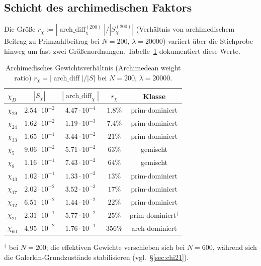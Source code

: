 \documentclass[a4paper,10pt,twocolumn]{article}
\theoremstyle{definition}
\theoremstyle{remark}
\newcommand{\chifn}{\chi}
\newcommand{\archdiff}{\operatorname{arch\_diff}}
\begin{document}
\subsection{Schicht des archimedischen Faktors}
\label{sec:archlayer}

Die Größe
$r_{\chifn}:=|\archdiff_{\chifn}^{(200)}|/|S_{\chifn}^{(200)}|$
(Verhältnis von archimedischem Beitrag zu Primzahlbeitrag bei $N=200$,
$\lambda=20000$) variiert über die Stichprobe hinweg um fast zwei Größenordnungen.
Tabelle~\ref{tab:archratio} dokumentiert diese Werte.

\begin{table}[t]
\caption{Archimedisches Gewichtsverhältnis (Archimedean weight ratio)
  $r_{\chifn}=|\archdiff|/|S|$ bei $N=200$, $\lambda=20000$.}
\label{tab:archratio}
\centering\scriptsize
\begin{tabular}{@{}lcccc@{}}
\toprule
$\chifn_D$ & $|S_{\chifn}|$ & $|\archdiff_{\chifn}|$ & $r_{\chifn}$ & Klasse \\
\midrule
$\chifn_{29}$ & $2.54\!\cdot\!10^{-2}$ & $4.47\!\cdot\!10^{-4}$ & $1.8\%$ & prim-dominiert \\
$\chifn_{24}$ & $1.62\!\cdot\!10^{-2}$ & $1.19\!\cdot\!10^{-3}$ & $7.4\%$ & prim-dominiert \\
$\chifn_{33}$ & $1.65\!\cdot\!10^{-1}$ & $3.44\!\cdot\!10^{-2}$ & $21\%$ & prim-dominiert \\
$\chifn_5$ & $9.06\!\cdot\!10^{-2}$ & $5.71\!\cdot\!10^{-2}$ & $63\%$ & gemischt \\
$\chifn_8$ & $1.16\!\cdot\!10^{-1}$ & $7.43\!\cdot\!10^{-2}$ & $64\%$ & gemischt \\
$\chifn_{13}$ & $1.02\!\cdot\!10^{-1}$ & $1.33\!\cdot\!10^{-2}$ & $13\%$ & prim-dominiert \\
$\chifn_{17}$ & $2.02\!\cdot\!10^{-2}$ & $3.52\!\cdot\!10^{-3}$ & $17\%$ & prim-dominiert \\
$\chifn_{12}$ & $6.51\!\cdot\!10^{-2}$ & $1.44\!\cdot\!10^{-2}$ & $22\%$ & prim-dominiert \\
$\chifn_{21}$ & $2.31\!\cdot\!10^{-1}$ & $5.77\!\cdot\!10^{-2}$ & $25\%$ & prim-dominiert$^\dagger$ \\
$\chifn_{60}$ & $4.95\!\cdot\!10^{-2}$ & $1.76\!\cdot\!10^{-1}$ & $356\%$ & arch-dominiert \\
\bottomrule
\end{tabular}

\smallskip
\footnotesize
$^\dagger$ bei $N=200$; die effektiven Gewichte verschieben sich bei $N=600$,
während sich die Galerkin-Grundzustände stabilisieren (vgl.\ \S\ref{sec:chi21}).
\end{table}
\end{document}
